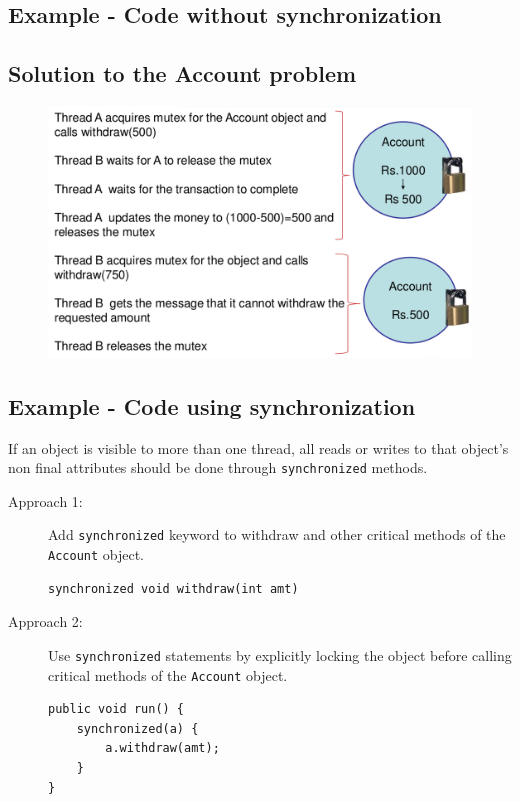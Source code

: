 \documentclass[11pt,a4paper]{article}
\begin{document}
\subsection*{Example - Code without synchronization}



\subsection*{Solution to the Account problem}
\begin{figure}[ht]
\begin{center}
\includegraphics[scale=0.26]{SolutionSynchronized.png}
\end{center}
\end{figure}
\subsection*{Example - Code using synchronization}
If an object is visible to more than one thread, all reads or writes to that object's non final attributes should be done through
\texttt{synchronized} methods.
\begin{description}
\item [Approach 1:]  Add \texttt{synchronized} keyword to withdraw and other critical methods of the \texttt{Account} object.
\begin{verbatim}
synchronized void withdraw(int amt)
\end{verbatim}
\item [Approach 2:] Use \texttt{synchronized} statements by explicitly locking the object before calling critical methods of the \texttt{Account} object. 
\begin{verbatim}
public void run() {
    synchronized(a) {
        a.withdraw(amt); 
    }
}
\end{verbatim}
\end{description}
\end{document}
